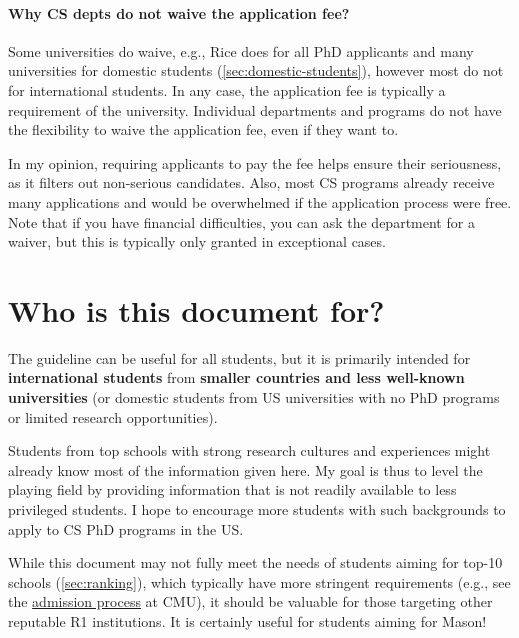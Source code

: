 \documentclass[oneside,11pt,dvipsnames]{book}
\def\sectioninfo#1{%
  \addcontentsline{toc}{sectioninfo}{%
    \noexpand\numberline{}\color{black}{#1}}%
}
\newcommand{\mycomment}[3][\color{blue}]{{#1{{#2}: {#3}}}}
\newcommand{\didi}[1]{\mycomment{Didier}{#1}}{}
\begin{document}


\paragraph{Why CS depts do not waive the application fee?}  Some universities do waive, e.g., Rice does for all PhD applicants and many universities for domestic students (\autoref{sec:domestic-students}), however most do not for international students.  In any case, the application fee is typically a requirement of the university. Individual departments and programs do not have the flexibility to waive the application fee, even if they want to.

In my opinion, requiring applicants to pay the fee helps ensure their seriousness, as it filters out non-serious candidates. Also, most CS programs already receive many applications and would be overwhelmed if the application process were free.  Note that if you have financial difficulties, you can ask the department for a waiver, but this is typically only granted in exceptional cases.


\section{Who is this document for?}
\sectioninfo{This document is mainly intended for international students from smaller countries and domestic students from less well-known universities.}

The guideline can be useful for all students, but it is primarily intended for \textbf{international students} from \textbf{smaller countries and less well-known universities} (or domestic students from US universities with no PhD programs or limited research opportunities).

Students from top schools with strong research cultures and experiences might already know most of the information given here.
My goal is thus to level the playing field by providing information that is not readily available to less privileged students. 
I hope to encourage more students with such backgrounds to apply to CS PhD programs in the US.

While this document may not fully meet the needs of students aiming for top-10 schools (\autoref{sec:ranking}), which typically have more stringent requirements (e.g., see the \href{https://da-data.blogspot.com/2015/03/reflecting-on-cs-graduate-admissions.html}{admission process} at CMU), it should be valuable for those targeting other reputable R1 institutions. It is certainly useful for students aiming for Mason!
\end{document}
